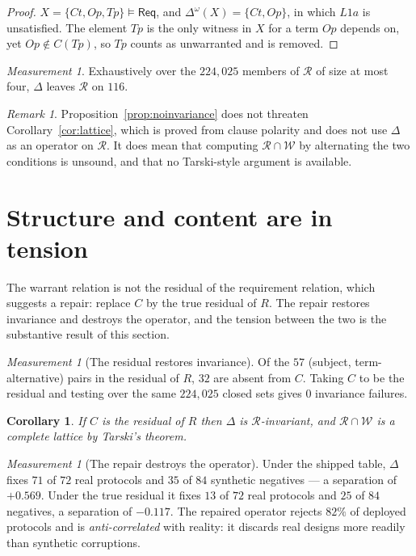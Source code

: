 \documentclass[11pt]{article}
\theoremstyle{definition}
\theoremstyle{plain}
\newtheorem{corollary}[definition]{Corollary}
\theoremstyle{remark}
\newtheorem{measurement}[definition]{Measurement}
\newtheorem{remark}[definition]{Remark}
\newcommand{\Law}{\mathsf{Req}}
\begin{document}
\begin{proof}
$X = \{Ct,Op,Tp\} \models \Law$, and $\Delta^{\omega}(X) = \{Ct,Op\}$, in which
$L1a$ is unsatisfied. The element $Tp$ is the only witness in $X$ for a term $Op$
depends on, yet $Op \notin C(Tp)$, so $Tp$ counts as unwarranted and is removed.
\end{proof}

\begin{measurement}\label{meas:noinvariance}
Exhaustively over the $224{,}025$ members of $\mathcal{R}$ of size at most four,
$\Delta$ leaves $\mathcal{R}$ on $116$.
\end{measurement}

\begin{remark}
Proposition~\ref{prop:noinvariance} does not threaten Corollary~\ref{cor:lattice},
which is proved from clause polarity and does not use $\Delta$ as an operator on
$\mathcal{R}$. It does mean that computing $\mathcal{R} \cap \mathcal{W}$ by
alternating the two conditions is unsound, and that no Tarski-style argument is
available.
\end{remark}

\section{Structure and content are in tension}\label{sec:tradeoff}

The warrant relation is not the residual of the requirement relation, which suggests a repair: replace $C$ by the true
residual of $R$. The repair restores invariance and destroys the operator, and the
tension between the two is the substantive result of this section.

\begin{measurement}[The residual restores invariance]\label{meas:repair}
Of the $57$ (subject, term-alternative) pairs in the residual of $R$, $32$ are
absent from $C$. Taking $C$ to be the residual and testing over the same
$224{,}025$ closed sets gives $0$ invariance failures.
\end{measurement}

\begin{corollary}\label{cor:residual}
If $C$ is the residual of $R$ then $\Delta$ is $\mathcal{R}$-invariant, and
$\mathcal{R} \cap \mathcal{W}$ is a complete lattice by Tarski's theorem.
\end{corollary}

\begin{measurement}[The repair destroys the operator]\label{meas:tradeoff}
Under the shipped table, $\Delta$ fixes $71$ of $72$ real protocols and $35$ of
$84$ synthetic negatives --- a separation of $+0.569$. Under the true residual it
fixes $13$ of $72$ real protocols and $25$ of $84$ negatives, a separation of
$-0.117$. The repaired operator rejects $82\%$ of deployed protocols and is
\emph{anti-correlated} with reality: it discards real designs more readily than
synthetic corruptions.
\end{measurement}
\end{document}
